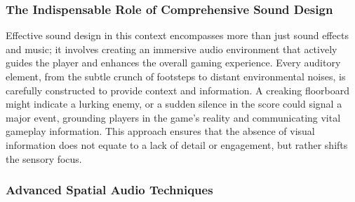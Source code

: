 \subsubsection{The Indispensable Role of Comprehensive Sound Design}

Effective sound design in this context encompasses more than just sound effects and music; it involves creating an immersive audio environment that actively guides the player and enhances the overall gaming experience\supercite{NumberAnalytics2025}. Every auditory element, from the subtle crunch of footsteps to distant environmental noises, is carefully constructed to provide context and information\supercite{RareformAudio2025}. A creaking floorboard might indicate a lurking enemy, or a sudden silence in the score could signal a major event, grounding players in the game's reality and communicating vital gameplay information\supercite{RareformAudio2025}. This approach ensures that the absence of visual information does not equate to a lack of detail or engagement, but rather shifts the sensory focus.

\subsubsection{Advanced Spatial Audio Techniques}

